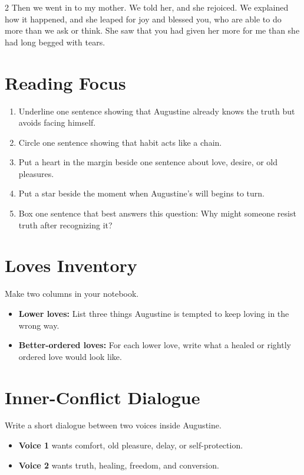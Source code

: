 \documentclass[12pt]{article}
\begin{document}
\begin{multicols}{2}
Then we went in to my mother. We told her, and she rejoiced. We explained how it happened, and she leaped for joy and blessed you, who are able to do more than we ask or think. She saw that you had given her more for me than she had long begged with tears.

\section*{Reading Focus}
\begin{enumerate}[leftmargin=*, itemsep=0.2em]
\item Underline one sentence showing that Augustine already knows the truth but avoids facing himself.
\item Circle one sentence showing that habit acts like a chain.
\item Put a heart in the margin beside one sentence about love, desire, or old pleasures.
\item Put a star beside the moment when Augustine's will begins to turn.
\item Box one sentence that best answers this question: Why might someone resist truth after recognizing it?
\end{enumerate}

\section*{Loves Inventory}
Make two columns in your notebook.

\begin{itemize}[leftmargin=*, itemsep=0.2em]
\item \textbf{Lower loves:} List three things Augustine is tempted to keep loving in the wrong way.
\item \textbf{Better-ordered loves:} For each lower love, write what a healed or rightly ordered love would look like.
\end{itemize}

\section*{Inner-Conflict Dialogue}
Write a short dialogue between two voices inside Augustine.

\begin{itemize}[leftmargin=*, itemsep=0.2em]
\item \textbf{Voice 1} wants comfort, old pleasure, delay, or self-protection.
\item \textbf{Voice 2} wants truth, healing, freedom, and conversion.
\end{itemize}


\end{multicols}
\end{document}
